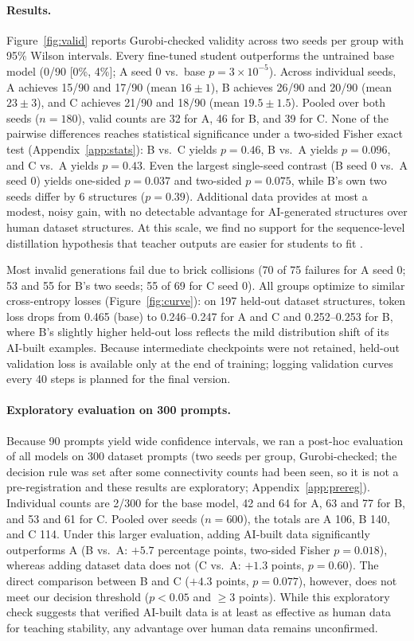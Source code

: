 \documentclass{article}
\begin{document}
\paragraph{Results.} Figure~\ref{fig:valid} reports Gurobi-checked validity across two seeds per group with 95\% Wilson intervals. Every fine-tuned student outperforms the untrained base model (0/90 [0\%, 4\%]; A seed 0 vs.\ base $p=3\times10^{-5}$). Across individual seeds, A achieves 15/90 and 17/90 (mean $16\pm1$), B achieves 26/90 and 20/90 (mean $23\pm3$), and C achieves 21/90 and 18/90 (mean $19.5\pm1.5$). Pooled over both seeds ($n=180$), valid counts are 32 for A, 46 for B, and 39 for C. None of the pairwise differences reaches statistical significance under a two-sided Fisher exact test (Appendix~\ref{app:stats}): B vs.\ C yields $p=0.46$, B vs.\ A yields $p=0.096$, and C vs.\ A yields $p=0.43$. Even the largest single-seed contrast (B seed 0 vs.\ A seed 0) yields one-sided $p=0.037$ and two-sided $p=0.075$, while B's own two seeds differ by 6 structures ($p=0.39$). Additional data provides at most a modest, noisy gain, with no detectable advantage for AI-generated structures over human dataset structures. At this scale, we find no support for the sequence-level distillation hypothesis that teacher outputs are easier for students to fit \cite{kim2016sequence}.

Most invalid generations fail due to brick collisions (70 of 75 failures for A seed 0; 53 and 55 for B's two seeds; 55 of 69 for C seed 0). All groups optimize to similar cross-entropy losses (Figure~\ref{fig:curve}): on 197 held-out dataset structures, token loss drops from 0.465 (base) to 0.246--0.247 for A and C and 0.252--0.253 for B, where B's slightly higher held-out loss reflects the mild distribution shift of its AI-built examples. Because intermediate checkpoints were not retained, held-out validation loss is available only at the end of training; logging validation curves every 40 steps is planned for the final version.

\paragraph{Exploratory evaluation on 300 prompts.} Because 90 prompts yield wide confidence intervals, we ran a post-hoc evaluation of all models on 300 dataset prompts (two seeds per group, Gurobi-checked; the decision rule was set after some connectivity counts had been seen, so it is not a pre-registration and these results are exploratory; Appendix~\ref{app:prereg}). Individual counts are 2/300 for the base model, 42 and 64 for A, 63 and 77 for B, and 53 and 61 for C. Pooled over seeds ($n=600$), the totals are A 106, B 140, and C 114. Under this larger evaluation, adding AI-built data significantly outperforms A (B vs.\ A: $+5.7$ percentage points, two-sided Fisher $p=0.018$), whereas adding dataset data does not (C vs.\ A: $+1.3$ points, $p=0.60$). The direct comparison between B and C ($+4.3$ points, $p=0.077$), however, does not meet our decision threshold ($p<0.05$ and $\ge3$ points). While this exploratory check suggests that verified AI-built data is at least as effective as human data for teaching stability, any advantage over human data remains unconfirmed.
\end{document}
